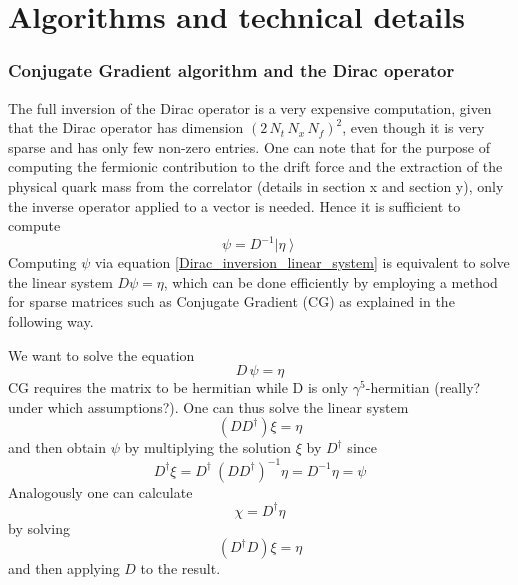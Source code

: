 \chapter{Algorithms and technical details}
\label{AppendixC}

\subsection{Conjugate Gradient algorithm and the Dirac operator}
The full inversion of the Dirac operator is a very expensive computation, given that the Dirac operator has dimension $(2 \, N_t \, N_x \, N_f)^2$, even though it is very sparse and has only few non-zero entries. One can note that for the purpose of computing the fermionic contribution to the drift force and the extraction of the physical quark mass from the correlator (details in section x and section y), only the inverse operator applied to a vector is needed. Hence it is sufficient to compute 
\begin{equation}
    \psi = D^{-1} \left| \eta \right\rangle
    \label{Dirac_inversion_linear_system}
\end{equation}
Computing $\psi$ via equation \eqref{Dirac_inversion_linear_system} is equivalent to solve the linear system $D \psi = \eta$, which can be done efficiently by employing a method for sparse matrices such as Conjugate Gradient (CG) as explained in the following way.

We want to solve the equation
\begin{equation*} 
    D \, \psi = \eta
\end{equation*}
CG requires the matrix to be hermitian while D is only $\gamma^5$-hermitian (really? under which assumptions?). One can thus solve the linear system
\begin{equation*}
    \left(D D^{\dagger} \right) \xi = \eta
\end{equation*}
and then obtain $\psi$ by multiplying the solution $\xi$ by $D^{\dagger}$ since 
\begin{equation}
    D^{\dagger} \xi = D^{\dagger} \ \left(D D^{\dagger}\right)^{-1} \eta = D^{-1} \eta = \psi
\end{equation}
Analogously one can calculate
\begin{equation*}
    \chi = D^{\dagger} \eta
\end{equation*}
by solving
\begin{equation*}
    \left(D^{\dagger} D\right) \xi = \eta
\end{equation*}
and then applying $D$ to the result.


